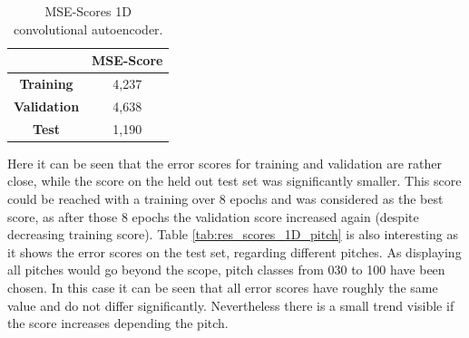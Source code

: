 \begin{table}[htb!]
    \centering
    \begin{tabular}{|c|c|}
        \hline
         & \textbf{MSE-Score} \\
         \hline
        \textbf{Training} & 4,237 \\
        \hline
        \textbf{Validation} & 4,638 \\
        \hline
        \textbf{Test} & 1,190 \\
        \hline
    \end{tabular}
    \caption{MSE-Scores 1D convolutional autoencoder.}%
    \label{tab:res_scores_1Dcae}
\end{table}

\newpage
Here it can be seen that the error scores for training and validation are rather close, while the score on the held out test set was significantly smaller. This score could be reached with a training over 8 epochs and was considered as the best score, as after those 8 epochs the validation score increased again (despite decreasing training score). Table \ref{tab:res_scores_1D_pitch} is also interesting as it shows the error scores on the test set, regarding different pitches. As displaying all pitches would go beyond the scope, pitch classes from 030 to 100 have been chosen. In this case it can be seen that all error scores have roughly the same value and do not differ significantly. Nevertheless there is a small trend visible if the score increases depending the pitch.

